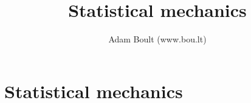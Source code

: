 \documentclass[oneside]{book}
\begin{document}
\author{Adam Boult (www.bou.lt)}
\title{Statistical mechanics}
\maketitle

\setcounter{tocdepth}{0}
\tableofcontents



\part{Statistical mechanics}

\end{document}
